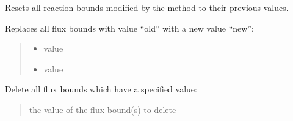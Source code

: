 \documentclass[letterpaper,12pt,english]{sphinxmanual}
\begin{document}
\begin{fulllineitems}
\begin{fulllineitems}
\label{\detokenize{api/core:cbmpy.CBModel.Model.resetAllInactiveGPRBounds}}
\pysigstartsignatures
\pysiglinewithargsret
{}
{}
{}
\pysigstopsignatures
\sphinxAtStartPar
Resets all reaction bounds modified by the
 method to their previous values.

\end{fulllineitems}


\begin{fulllineitems}
\label{\detokenize{api/core:cbmpy.CBModel.Model.changeAllFluxBoundsWithValue}}
\pysigstartsignatures
\pysiglinewithargsret
{}
{\sphinxparamcomma {}}
{}
\pysigstopsignatures
\sphinxAtStartPar
Replaces all flux bounds with value “old” with a new value “new”:
\begin{quote}\begin{description}
\begin{itemize}
\item {} 
\sphinxAtStartPar
{} \textendash{} value

\item {} 
\sphinxAtStartPar
{} \textendash{} value

\end{itemize}

\end{description}\end{quote}

\end{fulllineitems}


\begin{fulllineitems}
\label{\detokenize{api/core:cbmpy.CBModel.Model.deleteAllFluxBoundsWithValue}}
\pysigstartsignatures
\pysiglinewithargsret
{}
{}
{}
\pysigstopsignatures
\sphinxAtStartPar
Delete all flux bounds which have a specified value:
\begin{quote}\begin{description}
\sphinxAtStartPar
{} \textendash{} the value of the flux bound(s) to delete


\end{description}
\end{quote}
\end{fulllineitems}
\end{fulllineitems}
\end{document}
